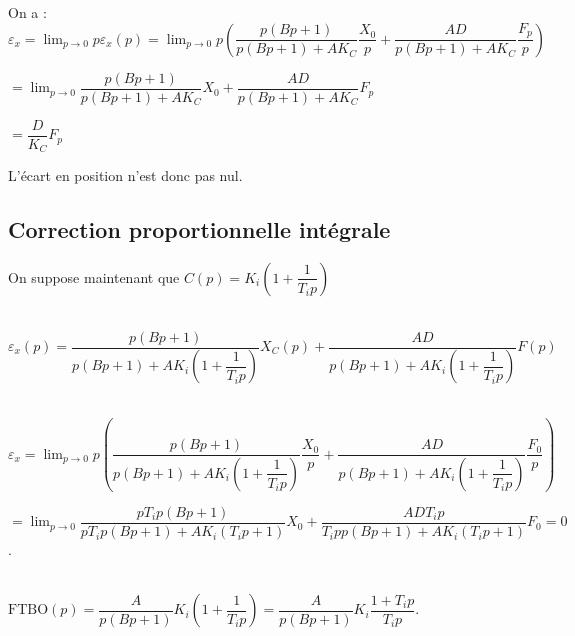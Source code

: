 \begin{multicols}{2}
\begin{corrige}
On a : 
$\varepsilon_x = \lim_{p\to 0} p\varepsilon_x(p) = \lim_{p\to 0} p\left(\dfrac{p\left(Bp+1 \right)}{p\left(Bp+1 \right)+AK_C}\dfrac{X_0}{p}+\dfrac{AD }{p\left(Bp+1 \right)+AK_C} \dfrac{F_p}{p}\right) $

$= \lim_{p\to 0} \dfrac{p\left(Bp+1 \right)}{p\left(Bp+1 \right)+AK_C}{X_0}+\dfrac{AD }{p\left(Bp+1 \right)+AK_C} {F_p} $

$= \dfrac{D }{K_C} {F_p} $

L'écart en position n'est donc pas nul.
\end{corrige}
\else
\fi

\subsection*{Correction proportionnelle intégrale}
On suppose maintenant que $C(p)=K_i\left(1+\dfrac{1}{T_ip}\right)$

\ifprof
\begin{corrige}~\\


$\varepsilon_x(p) =\dfrac{p\left(Bp+1 \right)}{p\left(Bp+1 \right)+AK_i\left(1+\dfrac{1}{T_ip}\right)}X_C(p)+\dfrac{AD }{p\left(Bp+1 \right)+AK_i\left(1+\dfrac{1}{T_ip}\right)} F(p) $

\end{corrige}
\else
\fi

\ifprof
\begin{corrige}~\\

$\varepsilon_x =\lim_{p\to 0} p\left(\dfrac{p\left(Bp+1 \right)}{p\left(Bp+1 \right)+AK_i\left(1+\dfrac{1}{T_ip}\right)}\dfrac{X_0}{p}+\dfrac{AD }{p\left(Bp+1 \right)+AK_i\left(1+\dfrac{1}{T_ip}\right)} \dfrac{F_0}{p}\right) $

$=\lim_{p\to 0} \dfrac{pT_ip\left(Bp+1 \right)}{pT_ip\left(Bp+1 \right)+AK_i\left(T_ip+1\right)}X_0+\dfrac{ADT_ip }{T_ipp\left(Bp+1 \right)+AK_i\left(T_ip+1\right)} F_0  = 0$.


\end{corrige}
\else
\fi


\ifprof
\begin{corrige}~\\
$\text{FTBO}(p)= \dfrac{A}{p\left(Bp+1\right)}K_i\left(1+\dfrac{1}{T_ip}\right)= \dfrac{A}{p\left(Bp+1\right)}K_i\dfrac{1+T_ip}{T_ip}$.



\end{corrige}
\end{multicols}
